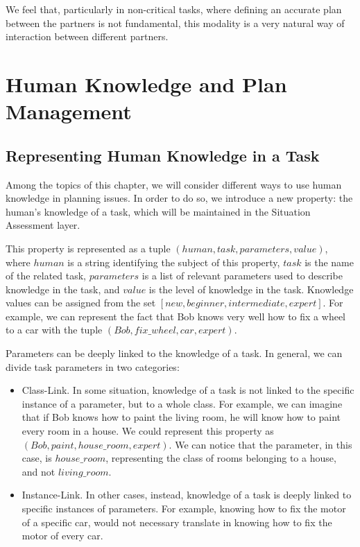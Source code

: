 We feel that, particularly in non-critical tasks, where defining an accurate plan between the partners is not
fundamental, this modality is a very natural way of
interaction between different partners.



\section{Human Knowledge and Plan Management}
\label{sec:plan_management-human_knowledge}
\subsection{Representing Human Knowledge in a Task}
Among the topics of this chapter, we will consider different ways to use human knowledge in planning issues. In order to do so, we introduce a new property: the human's knowledge of a task, which will be maintained in the Situation Assessment layer. 

This property is represented as a tuple $(human, task, parameters, value)$, where $human$ is a string identifying the subject of this property, $task$ is the name of the related task, $parameters$ is a list of relevant parameters used to describe knowledge in the task, and $value$ is the level of knowledge in the task. Knowledge values can be assigned from the set $[new, beginner, intermediate, expert]$.  For example, we can represent the fact that Bob knows very well how to fix a wheel to a car with the tuple $(Bob, fix\_wheel, car, expert)$. 

Parameters can be deeply linked to the knowledge of a task. In general, we can divide task parameters in two categories:
\begin{itemize}
\item Class-Link. In some situation, knowledge of a task is not linked to the specific instance of a parameter, but to a whole class. For example, we can imagine that if Bob knows how to paint the living room, he will know how to paint every room in a house. We could represent this property as $(Bob, paint, house\_room, expert)$. We can notice that the parameter, in this case, is $house\_room$, representing the class of rooms belonging to a house, and not $living\_room$.
\item Instance-Link. In other cases, instead, knowledge of a task is deeply linked to specific instances of parameters. For example, knowing how to fix the motor of a specific car, would not necessary translate in knowing how to fix the motor of every car.
\end{itemize}

